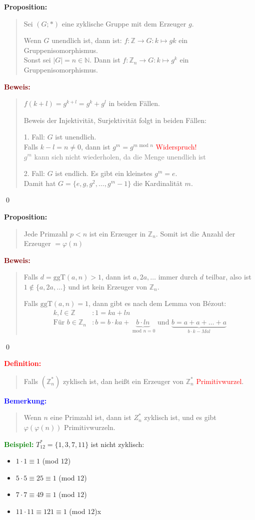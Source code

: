 \documentclass{article}
\newcommand{\red}[1]{\textcolor{red}{#1}}
\newcommand{\gray}[1]{\textcolor{gray}{#1}}
\newcommand{\blue}[1]{\textcolor{blue}{#1}}
\newcommand{\green}[1]{\textcolor{green}{#1}}
\newcommand{\dgr}[1]{\textcolor{dgr}{#1}}
\newcommand{\maroon}[1]{\textcolor{maroon}{#1}}
\newcommand{\ex}{\green{\textbf{Beispiel: }}}
\newcommand{\de}[1]{\red{\textbf{Definition: }}\begin{quote}#1\end{quote}}
\newcommand{\an}[1]{\blue{\textbf{Bemerkung: }}\begin{quote}#1\end{quote}}
\newcommand{\prop}[1]{\dgr{\textbf{Proposition: }}\begin{quote}#1\end{quote}}
\newcommand{\pr}[1]{\maroon{\textbf{Beweis: }}\begin{quote}#1\end{quote}\qed}
\newcommand{\N}{\mathbb{N}}
\newcommand{\Z}{\mathbb{Z}}
\renewcommand{\mod}{\text{ mod }}
\newcommand{\ggt}{\text{ggT}}
\begin{document}
\newpage
\prop{
    Sei $(G; *)$ eine zyklische Gruppe mit dem Erzeuger $g$.

    Wenn $G$ unendlich ist, dann ist: $f: \Z \to G: k \mapsto gk$ ein Gruppenisomorphismus.\\
    Sonst sei $|G| = n \in \N$. Dann ist $f: \Z_n \to G: k \mapsto g^k$ ein Gruppenisomorphismus.
}

\pr{
    $f(k + l) = g^{k+l} = g^k + g^l$ in beiden Fällen.

    Beweis der Injektivität, Surjektivität folgt in beiden Fällen:

    1. Fall: $G$ ist unendlich.\\
    Falls $k-l = n \ne 0$, dann ist $g^m = g^{m \mod n}$ \red{Widerspruch!}\\
    \gray{$g^m$ kann sich nicht wiederholen, da die Menge unendlich ist}

    2. Fall: $G$ ist endlich. Es gibt ein kleinstes $g^m = e$.\\
    Damit hat $G = \{e,g,g^2,\dots,g^m-1\}$ die Kardinalität $m$.
}

\prop{
    Jede Primzahl $p < n$ ist ein Erzeuger in $\Z_n$. Somit ist die Anzahl der Erzeuger $= \varphi(n)$
}

\pr{
    Falls $d = \ggt(a,n) > 1$, dann ist $a, 2a, \dots$ immer durch $d$ teilbar, also ist $1 \notin \{a,2a,\dots\}$ und ist kein Erzeuger von $\Z_n$.

    Falls $\ggt(a,n) = 1$, dann gibt es nach dem Lemma von Bézout:
    \begin{align*}
        k,l \in \Z&: 1 = ka + ln\\
        \text{Für } b \in \Z_n&: b = b \cdot ka + \underbrace{b \cdot ln }_{\mod n = 0}\text{ und } \underbrace{b = a + a + \dots + a}_{b \cdot k-Mal}
    \end{align*}
}

\de{
    Falls $(\Z_n^*)$ zyklisch ist, dan heißt ein Erzeuger von $\Z_n^*$ \red{Primitivwurzel}.
}

\an{
    Wenn $n$ eine Primzahl ist, dann ist $Z_n^*$ zyklisch ist, und es gibt $\varphi(\varphi(n))$ Primitivwurzeln.
}

\newpage
\ex $T_{12}^* = \{1,3,7,11\}$ ist nicht zyklisch:
\begin{itemize}
    \item $1 \cdot 1 \equiv 1$ (mod $12$)
    \item $5 \cdot 5 \equiv 25 \equiv 1$ (mod $12$)
    \item $7 \cdot 7 \equiv 49 \equiv 1$ (mod $12$)
    \item $11 \cdot 11 \equiv 121 \equiv 1$ (mod $12$)x
\end{itemize}
\end{document}
